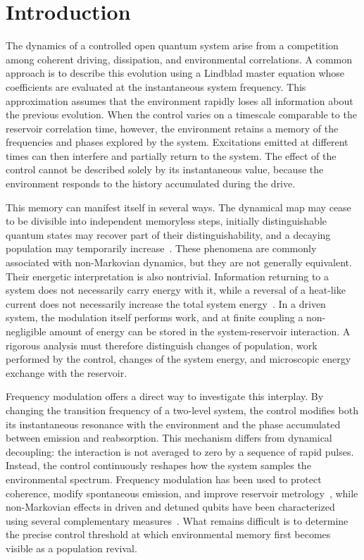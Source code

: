 \documentclass[reprint,superscriptaddress,floatfix,amsmath,amssymb,prresearch,aps]{revtex4-2}
\begin{document}
\section{Introduction}
\label{sec:introduction}

The dynamics of a controlled open quantum system arise from a competition among coherent driving, dissipation, and environmental correlations. A common approach is to describe this evolution using a Lindblad master equation whose coefficients are evaluated at the instantaneous system frequency. This approximation assumes that the environment rapidly loses all information about the previous evolution. When the control varies on a timescale comparable to the reservoir correlation time, however, the environment retains a memory of the frequencies and phases explored by the system. Excitations emitted at different times can then interfere and partially return to the system. The effect of the control cannot be described solely by its instantaneous value, because the environment responds to the history accumulated during the drive.

This memory can manifest itself in several ways. The dynamical map may cease to be divisible into independent memoryless steps, initially distinguishable quantum states may recover part of their distinguishability, and a decaying population may temporarily increase~\cite{Breuer2009,Rivas2010,Bylicka2014}. These phenomena are commonly
associated with non-Markovian dynamics, but they are not generally equivalent. Their energetic interpretation is also nontrivial. Information returning to a system does not necessarily carry energy with it, while a reversal of a heat-like current does not necessarily increase the total system energy~\cite{Strasberg2019,Ptaszynski2022,Picatoste2024,ZambonAdesso2025,
Guarnieri2016,Schmidt2016}. In a driven system, the modulation itself performs work, and at finite coupling a non-negligible amount of energy can be stored in the system-reservoir interaction. A rigorous analysis must therefore distinguish changes of population, work performed by the control, changes of the system energy, and microscopic energy exchange with the reservoir.

Frequency modulation offers a direct way to investigate this interplay. By changing the transition frequency of a two-level system, the control modifies both its instantaneous resonance with the environment and the phase accumulated between emission and reabsorption. This mechanism differs from dynamical decoupling: the interaction is not averaged to zero by a sequence of rapid pulses. Instead, the control continuously reshapes how the system samples the environmental spectrum. Frequency modulation has been used to protect coherence, modify spontaneous emission, and improve reservoir metrology~\cite{Mortezapour2018,Zhang2026,Khazaei2026}, while non-Markovian effects in driven and detuned qubits have been characterized using several complementary measures~\cite{Haikka2011,Li2010,Amati2024}. What remains difficult is to
determine the precise control threshold at which environmental
memory first becomes visible as a population revival.
\end{document}
